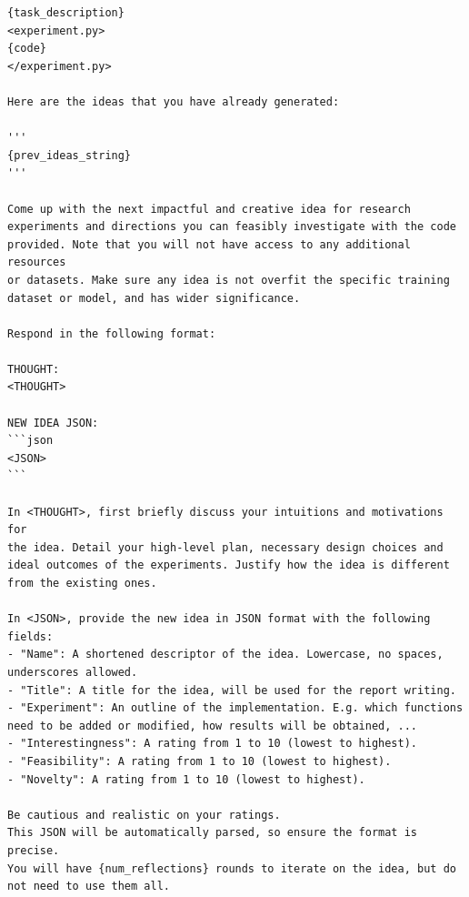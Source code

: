 \documentclass[11pt, a4paper]{include/gdm_format}
\begin{document}
\begin{tcolorbox}[breakable, colback=orange!5!white, colframe=orange!80!black, title=Idea Generation Prompt]
\small
\begin{verbatim}
{task_description}
<experiment.py>
{code}
</experiment.py>

Here are the ideas that you have already generated:

'''
{prev_ideas_string}
'''

Come up with the next impactful and creative idea for research 
experiments and directions you can feasibly investigate with the code 
provided. Note that you will not have access to any additional resources 
or datasets. Make sure any idea is not overfit the specific training  
dataset or model, and has wider significance.

Respond in the following format:

THOUGHT:
<THOUGHT>

NEW IDEA JSON:
```json
<JSON>
```

In <THOUGHT>, first briefly discuss your intuitions and motivations for 
the idea. Detail your high-level plan, necessary design choices and 
ideal outcomes of the experiments. Justify how the idea is different 
from the existing ones.

In <JSON>, provide the new idea in JSON format with the following fields:
- "Name": A shortened descriptor of the idea. Lowercase, no spaces,
underscores allowed.
- "Title": A title for the idea, will be used for the report writing.
- "Experiment": An outline of the implementation. E.g. which functions
need to be added or modified, how results will be obtained, ...
- "Interestingness": A rating from 1 to 10 (lowest to highest).
- "Feasibility": A rating from 1 to 10 (lowest to highest).
- "Novelty": A rating from 1 to 10 (lowest to highest).

Be cautious and realistic on your ratings.
This JSON will be automatically parsed, so ensure the format is precise.
You will have {num_reflections} rounds to iterate on the idea, but do 
not need to use them all.
\end{verbatim}
\end{tcolorbox}
\end{document}
